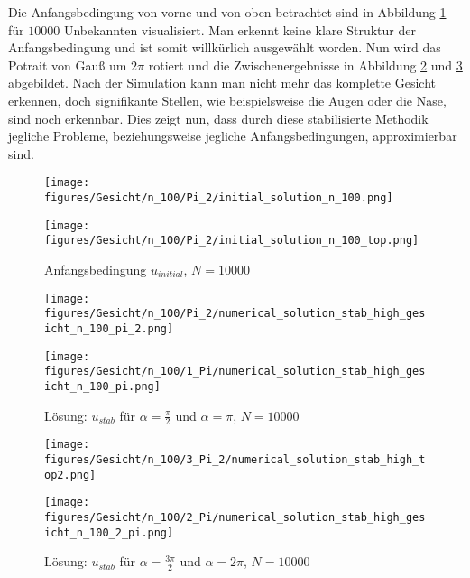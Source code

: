 \documentclass[12pt,titlepage]{article}
\begin{document}
Die Anfangsbedingung von vorne und von oben betrachtet sind in Abbildung \ref{fig:init_gauss} für $10000$ Unbekannten visualisiert. Man erkennt keine klare Struktur der Anfangsbedingung und ist somit willkürlich ausgewählt worden. Nun wird das Potrait von Gauß um $2\pi$ rotiert und die Zwischenergebnisse in Abbildung \ref{fig:gauss_pi} und \ref{fig:gauss_2pi} abgebildet. Nach der Simulation kann man nicht mehr das komplette Gesicht erkennen, doch signifikante Stellen, wie beispielsweise die Augen oder die Nase, sind noch erkennbar. Dies zeigt nun, dass durch diese stabilisierte Methodik jegliche Probleme, beziehungsweise jegliche Anfangsbedingungen, approximierbar sind.
\begin{figure}[H]
\begin{minipage}{0.4\textwidth}
\texttt{[image: figures/Gesicht/n\_100/Pi\_2/initial\_solution\_n\_100.png]}
\end{minipage}
\hspace{1.4cm}
\begin{minipage}{0.4\textwidth}
\texttt{[image: figures/Gesicht/n\_100/Pi\_2/initial\_solution\_n\_100\_top.png]}
\end{minipage}
\caption{Anfangsbedingung $u_{initial}$, $N=10000$}
\label{fig:init_gauss}
\end{figure}
\begin{figure}[H]
\begin{minipage}{0.45\textwidth}
 \texttt{[image: figures/Gesicht/n\_100/Pi\_2/numerical\_solution\_stab\_high\_gesicht\_n\_100\_pi\_2.png]}
\vspace{-0.4cm}
\end{minipage}
\begin{minipage}{0.45\textwidth}
 \texttt{[image: figures/Gesicht/n\_100/1\_Pi/numerical\_solution\_stab\_high\_gesicht\_n\_100\_pi.png]}
\vspace{-0.4cm}
\end{minipage}
\caption{Lösung: $u_{stab}$ für $\alpha=\frac{\pi}{2}$ und $\alpha=\pi$, $N=10000$}
\label{fig:gauss_pi}
\end{figure}
\vspace{-0.4cm}
\begin{figure}[H]
\begin{minipage}{0.45\textwidth}
 \texttt{[image: figures/Gesicht/n\_100/3\_Pi\_2/numerical\_solution\_stab\_high\_top2.png]}
\vspace{-0.4cm}
\end{minipage}
\begin{minipage}{0.45\textwidth}
 \texttt{[image: figures/Gesicht/n\_100/2\_Pi/numerical\_solution\_stab\_high\_gesicht\_n\_100\_2\_pi.png]}
\vspace{-0.4cm}
\end{minipage}
\caption{Lösung: $u_{stab}$ für $\alpha=\frac{3\pi}{2}$ und $\alpha=2\pi$, $N=10000$}
\label{fig:gauss_2pi}
\end{figure}
\pagebreak
\end{document}
